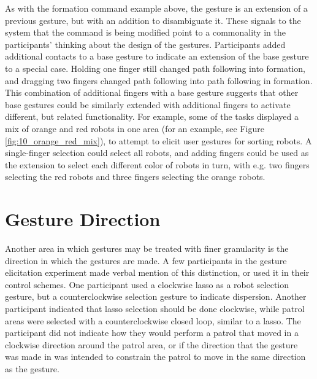 As with the formation command example above, the gesture is an extension of a previous gesture, but with an addition to disambiguate it. 
These signals to the system that the command is being modified point to a commonality in the participants' thinking about the design of the gestures. 
Participants added additional contacts to a base gesture to indicate an extension of the base gesture to a special case. 
Holding one finger still changed path following into formation, and dragging two fingers changed path following into path following in formation. 
This combination of additional fingers with a base gesture suggests that other base gestures could be similarly extended with additional fingers to activate different, but related functionality. 
For example, some of the tasks displayed a mix of orange and red robots in one area (for an example, see Figure \ref{fig:10_orange_red_mix}), to attempt to elicit user gestures for sorting robots. 
A single-finger selection could select all robots, and adding fingers could be used as the extension to select each different color of robots in turn, with e.g. two fingers selecting the red robots and three fingers selecting the orange robots. 

\section{Gesture Direction}

Another area in which gestures may be treated with finer granularity is the direction in which the gestures are made. 
A few participants in the gesture elicitation experiment made verbal mention of this distinction, or used it in their control schemes. 
One participant used a clockwise lasso as a robot selection gesture, but a counterclockwise selection gesture to indicate dispersion. 
Another participant indicated that lasso selection should be done clockwise, while patrol areas were selected with a counterclockwise closed loop, similar to a lasso. 
The participant did not indicate how they would perform a patrol that moved in a clockwise direction around the patrol area, or if the direction that the gesture was made in was intended to constrain the patrol to move in the same direction as the gesture. 

